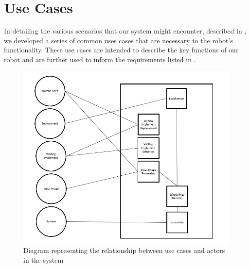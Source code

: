 
\section{Use Cases}
\label{sec:use_cases}


In detailing the various scenarios that our system might encounter, described in , we developed a series of common uses cases that are necessary to the robot's functionality. These use cases are intended to describe the key functions of our robot and are further used to inform the requirements listed in .

\begin{figure}
 \centering
  \includegraphics[width=0.48\columnwidth]{figs/use-cases-diagram.jpg}
	\caption{Diagram representing the relationship between use cases and actors in the system}
 \label{fig:use-cases}
\end{figure}

